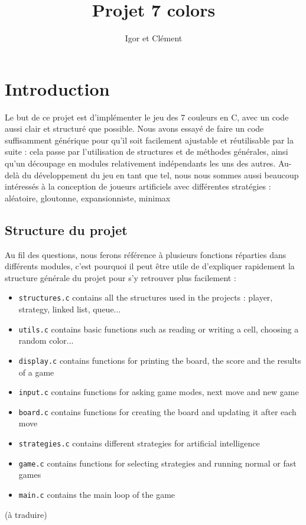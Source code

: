 \documentclass[12pt,S,fira-sans]{paper}
\title{Projet 7 colors}
\author{Igor \maj{Martayan} et Clément \maj{Morand}}
\begin{document}
\maketitle

\section*{Introduction}

Le but de ce projet est d'implémenter le jeu des 7 couleurs en C, avec un code aussi clair et structuré que possible.
Nous avons essayé de faire un code suffisamment générique pour qu'il soit facilement ajustable et réutilisable par la suite : cela passe par l'utilisation de structures et de méthodes générales, ainsi qu'un découpage en modules relativement indépendants les uns des autres.
Au-delà du développement du jeu en tant que tel, nous nous sommes aussi beaucoup intéressés à la conception de joueurs artificiels avec différentes stratégies : aléatoire, gloutonne, expansionniste, minimax\etc

\subsection*{Structure du projet}

Au fil des questions, nous ferons référence à plusieurs fonctions réparties dans différents modules, c'est pourquoi il peut être utile de d'expliquer rapidement la structure générale du projet pour s'y retrouver plus facilement :

\begin{itemize}
    \item \verb|structures.c| contains all the structures used in the projects : player, strategy, linked list, queue...
    \item \verb|utils.c| contains basic functions such as reading or writing a cell, choosing a random color...
    \item \verb|display.c| contains functions for printing the board, the score and the results of a game
    \item \verb|input.c| contains functions for asking game modes, next move and new game
    \item \verb|board.c| contains functions for creating the board and updating it after each move
    \item \verb|strategies.c| contains different strategies for artificial intelligence
    \item \verb|game.c| contains functions for selecting strategies and running normal or fast games
    \item \verb|main.c| contains the main loop of the game
\end{itemize}
(à traduire)
\end{document}
